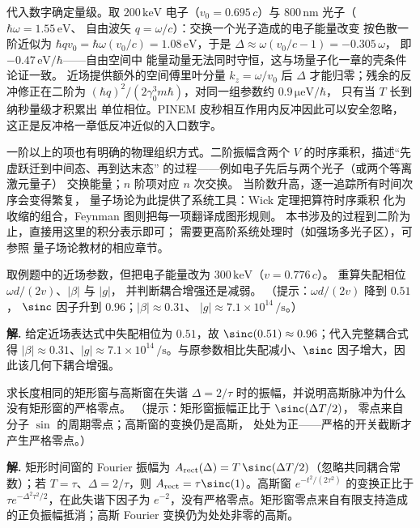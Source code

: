 代入数字确定量级。取 \(200\,\si{\kilo\electronvolt}\)
电子（\(v_0=0.695\,c\)）与 \(800\,\si{\nano\metre}\)
光子（\(\hbar\omega=1.55\,\si{\electronvolt}\)、
自由波矢 \(q=\omega/c\)）：交换一个光子造成的电子能量改变
按色散一阶近似为 \(\hbar qv_0=\hbar\omega(v_0/c)
=1.08\,\si{\electronvolt}\)，于是
\(\Delta\approx\omega(v_0/c-1)=-0.305\,\omega\)，
即 \(-0.47\,\si{\electronvolt}/\hbar\)——自由空间中
能量动量无法同时守恒，这与场量子化一章的壳条件论证一致。
近场提供额外的空间傅里叶分量 \(k_z=\omega/v_0\) 后
\(\Delta\) 才能归零；残余的反冲修正在二阶为
\((\hbar q)^2/(2\gamma_0^3m\hbar)\)，对同一组参数约
\(0.9\,\si{\micro\electronvolt}/\hbar\)，
只有当 \(T\) 长到纳秒量级才积累出
单位相位。PINEM 皮秒相互作用内反冲因此可以安全忽略，
这正是反冲格一章低反冲近似的入口数字。

一阶以上的项也有明确的物理组织方式。二阶振幅含两个
\(V\) 的时序乘积，描述“先虚跃迁到中间态、再到达末态”
的过程——例如电子先后与两个光子（或两个等离激元量子）
交换能量；\(n\) 阶项对应 \(n\) 次交换。
当阶数升高，逐一追踪所有时间次序会变得繁复，
量子场论为此提供了系统工具：Wick 定理把算符时序乘积
化为收缩的组合，Feynman 图则把每一项翻译成图形规则。
本书涉及的过程到二阶为止，直接用这里的积分表示即可；
需要更高阶系统处理时（如强场多光子区），可参照
量子场论教材的相应章节。


\par
\begin{workedexample}
取例题中的近场参数，但把电子能量改为
\(300\,\si{\kilo\electronvolt}\)（\(v=0.776\,c\)）。
重算失配相位 \(\omega d/(2v)\)、\(|\beta|\) 与 \(|g|\)，
并判断耦合增强还是减弱。
（提示：\(\omega d/(2v)\) 降到 \(0.51\)，
\(\sinc\) 因子升到 \(0.96\)；\(|\beta|\approx0.31\)、
\(|g|\approx7.1\times10^{14}\,\si{\per\second}\)。）

\textbf{解.} 给定近场表达式中失配相位为 \(0.51\)，故 \(\sinc(0.51)\approx0.96\)；代入完整耦合式得 \(|\beta|\approx0.31\)、\(|g|\approx7.1\times10^{14}\,\si{\per\second}\)。与原参数相比失配减小、\(\sinc\) 因子增大，因此该几何下耦合增强。
\end{workedexample}
\par

\par
\begin{workedexample}
求长度相同的矩形窗与高斯窗在失谐 \(\Delta=2/\tau\) 时的振幅，并说明高斯脉冲为什么没有矩形窗的严格零点。
（提示：矩形窗振幅正比于 \(\sinc(\Delta T/2)\)，
零点来自分子 \(\sin\) 的周期零点；高斯窗的变换仍是高斯，
处处为正——严格的开关截断才产生严格零点。）

\textbf{解.} 矩形时间窗的 Fourier 振幅为 \(A_{\rm rect}(\Delta)=T\,\sinc(\Delta T/2)\)（忽略共同耦合常数）；若 \(T=\tau\)、\(\Delta=2/\tau\)，则 \(A_{\rm rect}=\tau\sinc(1)\)。高斯窗 \(e^{-t^2/(2\tau^2)}\) 的变换正比于 \(\tau e^{-\Delta^2\tau^2/2}\)，在此失谐下因子为 \(e^{-2}\)，没有严格零点。矩形窗零点来自有限支持造成的正负振幅抵消；高斯 Fourier 变换仍为处处非零的高斯。
\end{workedexample}
\par
